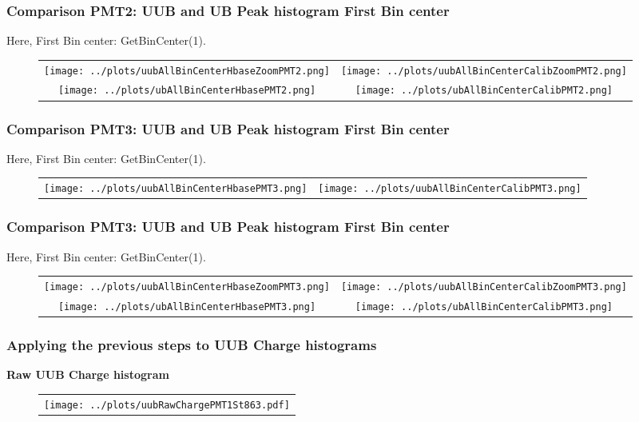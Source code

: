 \documentclass[aspectratio=169]{beamer}
\begin{document}
\begin{frame}
  \frametitle{Comparison PMT2: UUB and UB Peak histogram First Bin center}
  Here, First Bin center: GetBinCenter(1).
  \begin{figure}
    \centering
    \begin{tabularx}{\textwidth}{CC}
			\texttt{[image: ../plots/uubAllBinCenterHbaseZoomPMT2.png]}
			&
			\texttt{[image: ../plots/uubAllBinCenterCalibZoomPMT2.png]}
      \\
			\texttt{[image: ../plots/ubAllBinCenterHbasePMT2.png]}
			&
			\texttt{[image: ../plots/ubAllBinCenterCalibPMT2.png]}
		\end{tabularx}
	\end{figure}
\end{frame}


\begin{frame}
	\frametitle{Comparison PMT3: UUB and UB Peak histogram First Bin center}
	Here, First Bin center: GetBinCenter(1).
	\begin{figure}
		\centering
		\begin{tabularx}{\textwidth}{CC}
			\texttt{[image: ../plots/uubAllBinCenterHbasePMT3.png]}
			&
			\texttt{[image: ../plots/uubAllBinCenterCalibPMT3.png]}
    \end{tabularx}
  \end{figure}
\end{frame}

\begin{frame}
  \frametitle{Comparison PMT3: UUB and UB Peak histogram First Bin center}
  Here, First Bin center: GetBinCenter(1).
  \begin{figure}
    \centering
    \begin{tabularx}{\textwidth}{CC}
			\texttt{[image: ../plots/uubAllBinCenterHbaseZoomPMT3.png]}
			&
			\texttt{[image: ../plots/uubAllBinCenterCalibZoomPMT3.png]}
      \\
			\texttt{[image: ../plots/ubAllBinCenterHbasePMT3.png]}
			&
			\texttt{[image: ../plots/ubAllBinCenterCalibPMT3.png]}
		\end{tabularx}
	\end{figure}
\end{frame}




\begin{frame}
	\frametitle{Applying the previous steps to UUB Charge histograms}
	{\bf Raw UUB Charge histogram}
	\begin{figure}
		\begin{tabularx}{\textwidth}{C}
			\texttt{[image: ../plots/uubRawChargePMT1St863.pdf]}
		\end{tabularx}
	\end{figure}
\end{frame}
\end{document}
